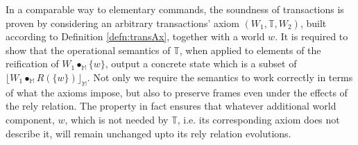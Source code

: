 In a comparable way to elementary commands, the soundness of transactions is proven by considering an arbitrary transactions' axiom $(W_1, \mathds{T}, W_2)$, built according to Definition \ref{defn:transAx}, together with a world $w$. It is required to show that the operational semantics of $\mathds{T}$, when applied to elements of the reification of $W_1 \bullet_\mathbb{M} \{w\}$, output a concrete state which is a subset of $\lfloor W_1 \bullet_\mathbb{M} R(\{w\}) \rfloor_\mathbb{M}$. Not only we require the semantics to work correctly in terms of what the axioms impose, but also to preserve frames even under the effects of the rely relation. The property in fact ensures that whatever additional world component, $w$, which is not needed by $\mathds{T}$, i.e. its corresponding axiom does not describe it, will remain unchanged upto its rely relation evolutions.
